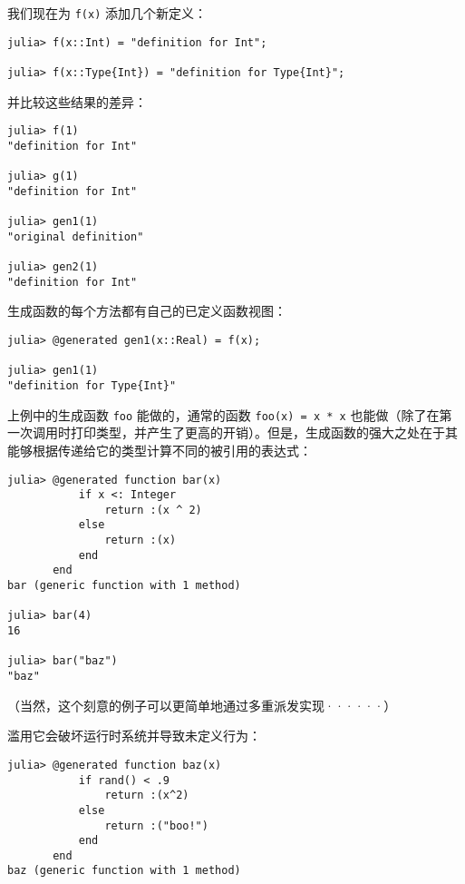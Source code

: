 我们现在为 \texttt{f(x)} 添加几个新定义：




\begin{verbatim}
julia> f(x::Int) = "definition for Int";

julia> f(x::Type{Int}) = "definition for Type{Int}";
\end{verbatim}



并比较这些结果的差异：




\begin{verbatim}
julia> f(1)
"definition for Int"

julia> g(1)
"definition for Int"

julia> gen1(1)
"original definition"

julia> gen2(1)
"definition for Int"
\end{verbatim}



生成函数的每个方法都有自己的已定义函数视图：




\begin{verbatim}
julia> @generated gen1(x::Real) = f(x);

julia> gen1(1)
"definition for Type{Int}"
\end{verbatim}



上例中的生成函数 \texttt{foo} 能做的，通常的函数 \texttt{foo(x) = x * x} 也能做（除了在第一次调用时打印类型，并产生了更高的开销）。但是，生成函数的强大之处在于其能够根据传递给它的类型计算不同的被引用的表达式：




\begin{verbatim}
julia> @generated function bar(x)
           if x <: Integer
               return :(x ^ 2)
           else
               return :(x)
           end
       end
bar (generic function with 1 method)

julia> bar(4)
16

julia> bar("baz")
"baz"
\end{verbatim}



（当然，这个刻意的例子可以更简单地通过多重派发实现······）



滥用它会破坏运行时系统并导致未定义行为：




\begin{verbatim}
julia> @generated function baz(x)
           if rand() < .9
               return :(x^2)
           else
               return :("boo!")
           end
       end
baz (generic function with 1 method)
\end{verbatim}



